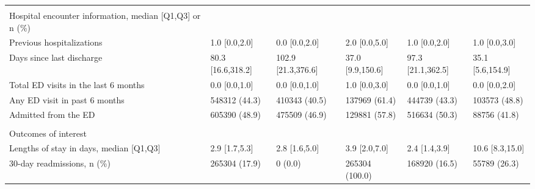 \begin{adjustbox}{width={\textwidth},totalheight={\textheight},keepaspectratio,frame}
{\begin{tabular}{L{20em}C{10em}C{10em}C{10em}C{10em}C{10em}}
&                 &                            &                        &                             &                        \\
Hospital encounter information, median [Q1,Q3] or n (\%) &                 &                            &                        &                             &                        \\
\hspace{3mm}          Previous hospitalizations &      1.0 [0.0,2.0] &                 0.0 [0.0,2.0] &             2.0 [0.0,5.0] &                  1.0 [0.0,2.0] &             1.0 [0.0,3.0] \\
\hspace{3mm}         Days since last discharge &  80.3 [16.6,318.2] &            102.9 [21.3,376.6] &          37.0 [9.9,150.6] &              97.3 [21.1,362.5] &          35.1 [5.6,154.9] \\
\hspace{3mm}          Total ED visits in the last 6 months &      0.0 [0.0,1.0] &                 0.0 [0.0,1.0] &             1.0 [0.0,3.0] &                  0.0 [0.0,1.0] &             0.0 [0.0,2.0] \\
\hspace{3mm} Any ED visit in past 6 months &      548312 (44.3) &                 410343 (40.5) &             137969 (61.4) &                  444739 (43.3) &             103573 (48.8) \\
\hspace{3mm}                  Admitted from the ED &      605390 (48.9) &                 475509 (46.9) &             129881 (57.8) &                  516634 (50.3) &              88756 (41.8) \\
&                 &                            &                        &                             &                        \\
Outcomes of interest &                 &                            &                        &                             &                        \\
\hspace{3mm}    Lengths of stay in days, median [Q1,Q3] &      2.9 [1.7,5.3] &                 2.8 [1.6,5.0] &             3.9 [2.0,7.0] &                  2.4 [1.4,3.9] &           10.6 [8.3,15.0] \\
\hspace{3mm}                30-day readmissions, n (\%) &      265304 (17.9) &                       0 (0.0) &            265304 (100.0) &                  168920 (16.5) &              55789 (26.3) \\
\end{tabular}
\label{table:table1}
}
\end{adjustbox}

%